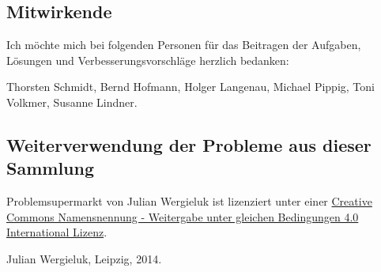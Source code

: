 \subsection*{Mitwirkende}

Ich möchte mich bei folgenden Personen für das Beitragen der Aufgaben, Lösungen und
Verbesserungsvorschläge herzlich bedanken: 

Thorsten Schmidt, Bernd Hofmann, Holger Langenau, Michael Pippig, Toni Volkmer,
Susanne Lindner.

\subsection*{Weiterverwendung der Probleme aus dieser Sammlung}

Problemsupermarkt von Julian Wergieluk ist lizenziert unter einer
\href{http://creativecommons.org/licenses/by-sa/4.0/}{Creative Commons
Namensnennung - Weitergabe unter gleichen Bedingungen 4.0 International
Lizenz}.

\begin{flushright}
Julian Wergieluk, Leipzig, 2014.
\end{flushright}



